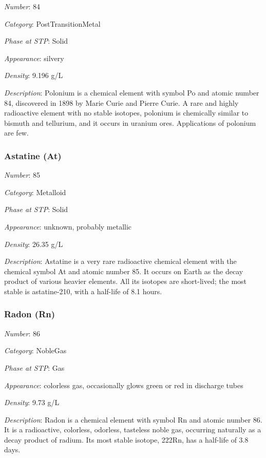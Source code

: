 \documentclass{article}
\begin{document}
\textit{Number}: 84

\textit{Category}: PostTransitionMetal

\textit{Phase at STP}: Solid

\textit{Appearance}: silvery

\textit{Density}: 9.196 g/L

\textit{Description}: Polonium is a chemical element with symbol Po and atomic number 84, discovered in 1898 by Marie Curie and Pierre Curie. A rare and highly radioactive element with no stable isotopes, polonium is chemically similar to bismuth and tellurium, and it occurs in uranium ores. Applications of polonium are few.

\hypertarget{subsubsection::At}{}\subsubsection{Astatine (At)}

\textit{Number}: 85

\textit{Category}: Metalloid

\textit{Phase at STP}: Solid

\textit{Appearance}: unknown, probably metallic

\textit{Density}: 26.35 g/L

\textit{Description}: Astatine is a very rare radioactive chemical element with the chemical symbol At and atomic number 85. It occurs on Earth as the decay product of various heavier elements. All its isotopes are short-lived; the most stable is astatine-210, with a half-life of 8.1 hours.

\hypertarget{subsubsection::Rn}{}\subsubsection{Radon (Rn)}

\textit{Number}: 86

\textit{Category}: NobleGas

\textit{Phase at STP}: Gas

\textit{Appearance}: colorless gas, occasionally glows green or red in discharge tubes

\textit{Density}: 9.73 g/L

\textit{Description}: Radon is a chemical element with symbol Rn and atomic number 86. It is a radioactive, colorless, odorless, tasteless noble gas, occurring naturally as a decay product of radium. Its most stable isotope, 222Rn, has a half-life of 3.8 days.
\end{document}
